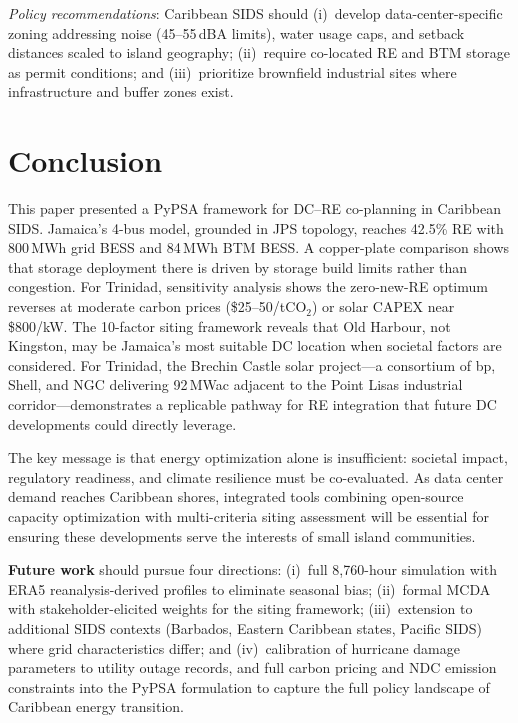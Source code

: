 \documentclass[conference,10pt]{IEEEtran}
\begin{document}
\textit{Policy recommendations}: Caribbean SIDS should (i)~develop data-center-specific zoning addressing noise (45--55\,dBA limits), water usage caps, and setback distances scaled to island geography; (ii)~require co-located RE and BTM storage as permit conditions; and (iii)~prioritize brownfield industrial sites where infrastructure and buffer zones exist.

\section{Conclusion}

This paper presented a PyPSA framework for DC--RE co-planning in Caribbean SIDS. Jamaica's 4-bus model, grounded in JPS topology, reaches 42.5\% RE with 800\,MWh grid BESS and 84\,MWh BTM BESS. A copper-plate comparison shows that storage deployment there is driven by storage build limits rather than congestion. For Trinidad, sensitivity analysis shows the zero-new-RE optimum reverses at moderate carbon prices (\$25--50/tCO$_2$) or solar CAPEX near \$800/kW. The 10-factor siting framework reveals that Old Harbour, not Kingston, may be Jamaica's most suitable DC location when societal factors are considered. For Trinidad, the Brechin Castle solar project---a consortium of bp, Shell, and NGC delivering 92\,MWac adjacent to the Point Lisas industrial corridor---demonstrates a replicable pathway for RE integration that future DC developments could directly leverage.

The key message is that energy optimization alone is insufficient: societal impact, regulatory readiness, and climate resilience must be co-evaluated. As data center demand reaches Caribbean shores, integrated tools combining open-source capacity optimization with multi-criteria siting assessment will be essential for ensuring these developments serve the interests of small island communities.

\textbf{Future work} should pursue four directions: (i)~full 8{,}760-hour simulation with ERA5 reanalysis-derived profiles to eliminate seasonal bias; (ii)~formal MCDA with stakeholder-elicited weights for the siting framework; (iii)~extension to additional SIDS contexts (Barbados, Eastern Caribbean states, Pacific SIDS) where grid characteristics differ; and (iv)~calibration of hurricane damage parameters to utility outage records, and full carbon pricing and NDC emission constraints into the PyPSA formulation to capture the full policy landscape of Caribbean energy transition.
\end{document}
